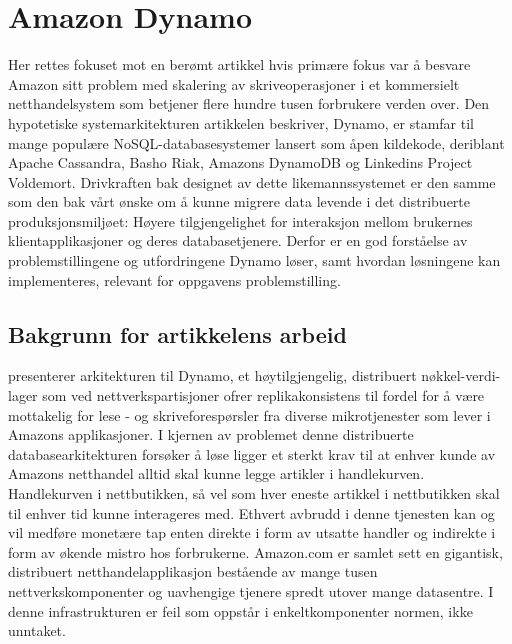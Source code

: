 \section{Amazon Dynamo}

Her rettes fokuset mot en berømt artikkel hvis primære fokus var å besvare Amazon sitt problem med skalering av skriveoperasjoner i et kommersielt netthandelsystem som betjener flere hundre tusen forbrukere verden over. Den hypotetiske systemarkitekturen artikkelen beskriver, Dynamo, er stamfar til mange populære NoSQL-databasesystemer lansert som åpen kildekode, deriblant Apache Cassandra, Basho Riak, Amazons DynamoDB og Linkedins Project Voldemort. Drivkraften bak designet av dette likemannssystemet er den samme som den bak vårt ønske om å kunne migrere data levende i det distribuerte produksjonsmiljøet: Høyere tilgjengelighet for interaksjon mellom brukernes klientapplikasjoner og deres databasetjenere. Derfor er en god forståelse av problemstillingene og utfordringene Dynamo løser, samt hvordan løsningene kan implementeres, relevant for oppgavens problemstilling.

\subsection{Bakgrunn for artikkelens arbeid}

\cite{decandia2007} presenterer arkitekturen til Dynamo, et høytilgjengelig, distribuert nøkkel-verdi-lager som ved nettverkspartisjoner ofrer replikakonsistens til fordel for å være mottakelig for lese - og skriveforespørsler fra diverse mikrotjenester som lever i Amazons applikasjoner. I kjernen av problemet denne distribuerte databasearkitekturen forsøker å løse ligger et sterkt krav til at enhver kunde av Amazons netthandel alltid skal kunne legge artikler i handlekurven. Handlekurven i nettbutikken, så vel som hver eneste artikkel i nettbutikken skal til enhver tid kunne interageres med. Ethvert avbrudd i denne tjenesten kan og vil medføre monetære tap enten direkte i form av utsatte handler og indirekte i form av økende mistro hos forbrukerne. Amazon.com er samlet sett en gigantisk, distribuert netthandelapplikasjon bestående av mange tusen nettverkskomponenter og uavhengige tjenere spredt utover mange datasentre. I denne infrastrukturen er feil som oppstår i enkeltkomponenter normen, ikke unntaket.

